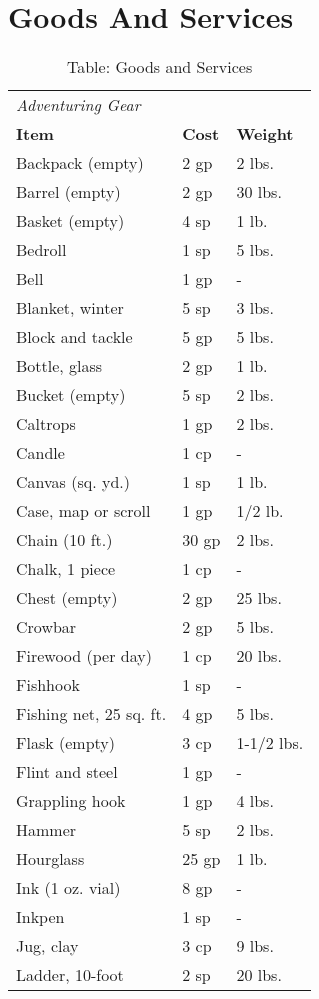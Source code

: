 \section{Goods And Services}
\begin{table*}[]
\sffamily
\caption{Table: Goods and Services}
\begin{tabular}{lll}
\textit{Adventuring Gear}\\
\textbf{Item} & \textbf{Cost} & \textbf{Weight}\\
Backpack (empty) & 2 gp & 2 lbs. \\
 Barrel (empty) & 2 gp & 30 lbs. \\
 Basket (empty) & 4 sp & 1 lb. \\
 Bedroll & 1 sp & 5 lbs. \\
 Bell & 1 gp & - \\
 Blanket, winter & 5 sp & 3 lbs. \\
 Block and tackle & 5 gp & 5 lbs. \\
 Bottle, glass & 2 gp & 1 lb. \\
 Bucket (empty) & 5 sp & 2 lbs. \\
 Caltrops & 1 gp & 2 lbs. \\
 Candle & 1 cp & - \\
 Canvas (sq. yd.) & 1 sp & 1 lb. \\
 Case, map or scroll & 1 gp & 1/2 lb. \\
 Chain (10 ft.) & 30 gp & 2 lbs. \\
 Chalk, 1 piece & 1 cp & - \\
 Chest (empty) & 2 gp & 25 lbs. \\
 Crowbar & 2 gp & 5 lbs. \\
 Firewood (per day) & 1 cp & 20 lbs. \\
 Fishhook & 1 sp & - \\
 Fishing net, 25 sq. ft. & 4 gp & 5 lbs. \\
 Flask (empty) & 3 cp & 1-1/2 lbs. \\
 Flint and steel & 1 gp & - \\
 Grappling hook & 1 gp & 4 lbs. \\
 Hammer & 5 sp & 2 lbs. \\
 Hourglass & 25 gp & 1 lb. \\
 Ink (1 oz. vial) & 8 gp & - \\
 Inkpen & 1 sp & - \\
 Jug, clay & 3 cp & 9 lbs. \\
 Ladder, 10-foot & 2 sp & 20 lbs. \\

\end{tabular}
\end{table*}
